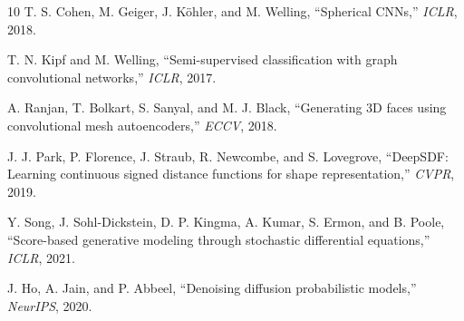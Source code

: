 \documentclass[twocolumn]{article}
\begin{document}
\begin{thebibliography}{10}
		T. S. Cohen, M. Geiger, J. Köhler, and M. Welling, ``Spherical CNNs,'' \textit{ICLR}, 2018.
		
		T. N. Kipf and M. Welling, ``Semi-supervised classification with graph convolutional networks,'' \textit{ICLR}, 2017.
		
		A. Ranjan, T. Bolkart, S. Sanyal, and M. J. Black, ``Generating 3D faces using convolutional mesh autoencoders,'' \textit{ECCV}, 2018.
		
		J. J. Park, P. Florence, J. Straub, R. Newcombe, and S. Lovegrove, ``DeepSDF: Learning continuous signed distance functions for shape representation,'' \textit{CVPR}, 2019.
		
		Y. Song, J. Sohl-Dickstein, D. P. Kingma, A. Kumar, S. Ermon, and B. Poole, ``Score-based generative modeling through stochastic differential equations,'' \textit{ICLR}, 2021.
		
		J. Ho, A. Jain, and P. Abbeel, ``Denoising diffusion probabilistic models,'' \textit{NeurIPS}, 2020.
		
	\end{thebibliography}
	
\end{document}
